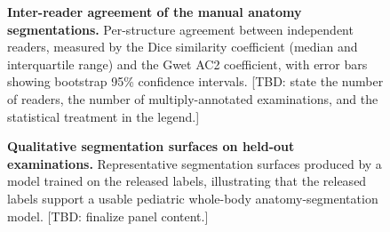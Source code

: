 \begin{figure}[t]
\centering
{}
\caption{\textbf{Inter-reader agreement of the manual anatomy segmentations.}
Per-structure agreement between independent readers, measured by the Dice similarity coefficient (median and interquartile range) and the Gwet AC2 coefficient, with error bars showing bootstrap 95\% confidence intervals. [TBD: state the number of readers, the number of multiply-annotated examinations, and the statistical treatment in the legend.]}
\label{fig:agreement}
\end{figure}

\begin{figure}[t]
\centering
{}
\caption{\textbf{Qualitative segmentation surfaces on held-out examinations.}
Representative segmentation surfaces produced by a model trained on the released labels, illustrating that the released labels support a usable pediatric whole-body anatomy-segmentation model. [TBD: finalize panel content.]}
\label{fig:baseline}
\end{figure}
